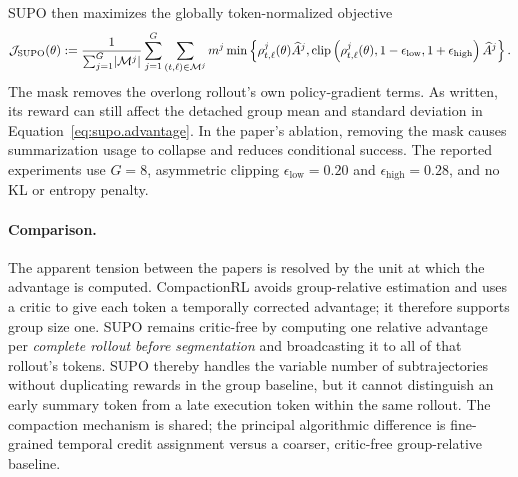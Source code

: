 SUPO then maximizes the globally token-normalized objective
\begin{align}
    {\cal J}_{\mathrm{SUPO}}(\theta)
    :=
    \frac{1}{\sum_{j=1}^{G}\lvert{\cal M}^j\rvert}
    \sum_{j=1}^{G}
    \sum_{(t,\ell)\in{\cal M}^j}
    m^j
    \min\left\{
        \rho_{t,\ell}^j(\theta)\widehat A^j,
        \operatorname{clip}\left(
            \rho_{t,\ell}^j(\theta),
            1-\epsilon_{\mathrm{low}},
            1+\epsilon_{\mathrm{high}}
        \right)\widehat A^j
    \right\}.
    \label{eq:supo.objective}
\end{align}
The mask removes the overlong rollout's own policy-gradient terms.  As written,
its reward can still affect the detached group mean and standard deviation in
Equation~\eqref{eq:supo.advantage}.  In the paper's ablation, removing the mask
causes summarization usage to collapse and reduces conditional success.  The
reported experiments use $G=8$, asymmetric clipping
$\epsilon_{\mathrm{low}}=0.20$ and
$\epsilon_{\mathrm{high}}=0.28$, and no KL or entropy penalty.

\paragraph{Comparison.}
The apparent tension between the papers is resolved by the unit at which the
advantage is computed.  CompactionRL avoids group-relative estimation and uses
a critic to give each token a temporally corrected advantage; it therefore
supports group size one.  SUPO remains critic-free by computing one relative
advantage per \emph{complete rollout before segmentation} and broadcasting it
to all of that rollout's tokens.  SUPO thereby handles the variable number of
subtrajectories without duplicating rewards in the group baseline, but it
cannot distinguish an early summary token from a late execution token within
the same rollout.  The compaction mechanism is shared; the principal
algorithmic difference is fine-grained temporal credit assignment versus a
coarser, critic-free group-relative baseline.